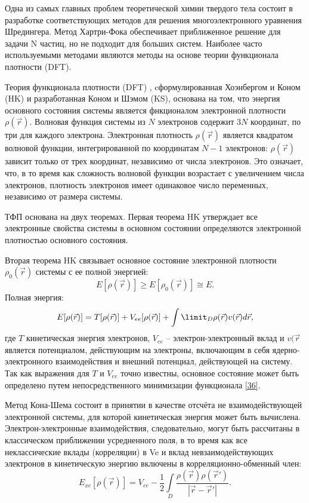 Одна из самых главных проблем теоретической химии твердого тела состоит в разработке соответствующих методов для решения многоэлектронного уравнения Шредингера. Метод Хартри-Фока обеспечивает приближенное решение для задачи N частиц, но не подходит для больших систем. Наиболее часто используемыми методами являются методы на основе теории функционала плотности (DFT).

Теория функционала плотности (DFT) , cформулированная Хоэнбергом и Коном (HK) и разработанная Коном и Шэмом (KS), основана на том, что энергия основного состояния системы является фнкционалом электронной плотности \(\rho(\vec{r})\).
Волновая функция системы из \(N\) электронов содержит \(3N\) координат, по три для каждого электрона. Электронная плотность \(\rho(\vec{r})\) является квадратом волновой функции, интегрированной по координатам \(N-1\) электронов: \(\rho(\vec{r})\) зависит только от трех координат, независимо от числа электронов. Это означает, что, в то время как сложность волновой функции возрастает с увеличением числа электронов, плотность электронов имеет одинаковое число переменных, независимо от размера системы.

ТФП основана на двух теоремах. Первая теорема HK утверждает все электронные свойства системы в основном состоянии определяются электронной плотностью основного состояния.

Вторая теорема HK связывает основное состояние электронной плотности \(\rho_0(\vec{r})\) системы с ее полной энергией:
\begin{equation}
    E[\rho(\vec{r})] \ge E[\rho_0(\vec{r})] \cong E.
\end{equation}
Полная энергия:
\begin{equation}
    E[\rho(\vec{r})] = T[\rho(\vec{r})] + V_{ee}[\rho(\vec{r})]+
    \int\limit_D \rho(\vec{r}) v(\vec{r}) d\vec{r},
    \label{eq:36}
\end{equation}
где \(T\) кинетическая энергия электронов, \(V_{ee}\) -- электрон-электронный вклад и \(v(\vec{r}\) является потенциалом, действующим на электроны, включающим в себя ядерно-электронного взаимодействия и внешний потенциал, действующей на систему. Так как выражения для \( T \) и \(V_{ee}\) точно известны, основное состояние может быть определено путем непосредственного минимизации функционала \eqref{36}.

Метод Кона-Шема состоит в принятии в качестве отсчёта не взаимодействующей электронной системы, для которой кинетическая энергия может быть вычислена. Электрон-электронные взаимодействия, следовательно, могут быть рассчитаны в классическом  приближении усредненного поля, в то время как все неклассические вклады (корреляции) в Ve и вклад невзаимодействующих электронов в кинетическую энергию включены в корреляционно-обменный член:
\begin{equation}
    E_{xc}[\rho(\vec{r})] = V_{ee} - \frac{1}{2}\int\limits_{D}\frac{\rho(\vec{r})\rho(\vec{r}')}{|\vec{r} - \vec{r}'|}.
    \label{eq:37}
\end{equation}

